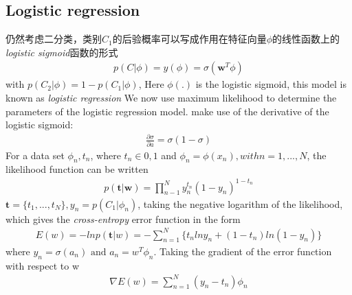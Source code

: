 \documentclass[a4paper]{article}
\begin{document}
\subsection{Logistic regression}
仍然考虑二分类，类别$C_1$的后验概率可以写成作用在特征向量$\phi$的线性函数上的 \emph{logistic sigmoid}函数的形式
\begin{align}
p(C|\phi) = y(\phi) = \sigma(\mathbf{w}^T \phi)
\end{align}
with $p(C_2|\phi) = 1 - p(C_1|\phi)$, Here $\phi(.)$ is the logistic sigmoid,
 this model is known as \textit{logistic regression}
We now use maximum likelihood to determine the parameters of the
 logistic regression model. make use of the derivative of the logistic sigmoid:
\begin{align}
\tfrac{\partial \sigma}{\partial a} = \sigma (1-\sigma)
\end{align}
For a data set ${\phi_n, t_n}$, where $t_n \in {0, 1}$ and $\phi_n = \phi(x_n),
with n = 1,...,N$, the likelihood function can be written
\begin{align}
p(\mathbf{t}|\mathbf{w}) = \displaystyle\prod_{n-1}^{N} y_n^{t_n}(1-y_n)^{1-t_n}
\end{align}
$\mathbf{t} = \{t_1,...,t_N\}, y_n = p(C_1|\phi_n)$,
taking the negative logarithm of the likelihood, which gives the
 \textit{cross-entropy} error function in the form
\begin{align}
E(w) = -ln \mathit{p} (\mathbf{t}|w) = - \displaystyle \sum_{n=1}^N \{
  \mathit{t_n}ln\mathit{y_n} + (1-\mathit{t_n})ln(1-\mathit{y_n}) \}
\end{align}
where $y_n = \sigma(a_n) \text{ and } a_n = w^T \phi_n$. Taking the gradient of
 the error function with respect to w
\begin{align}
\nabla E(w) = \displaystyle \sum_{n=1}^N (\mathit{y_n} -\mathit{t_n}) \phi_n
\end{align}
\end{document}
